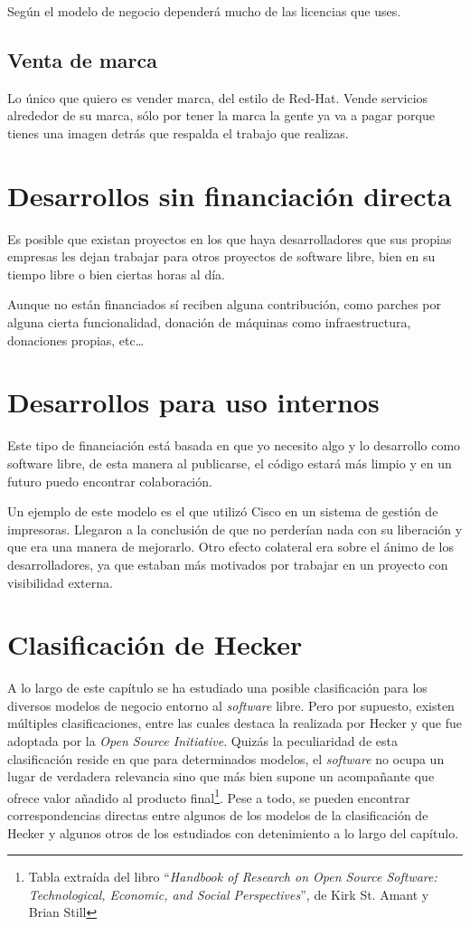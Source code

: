 Según el modelo de negocio dependerá mucho de las licencias que uses.

\subsection{Venta de marca}
Lo único que quiero es vender marca, del estilo de Red-Hat. Vende servicios
alrededor de su marca, sólo por tener la marca la gente ya va a pagar porque
tienes una imagen detrás que respalda el trabajo que realizas.

\section{Desarrollos sin financiación directa}
Es posible que existan proyectos en los que haya desarrolladores que sus
propias empresas les dejan trabajar para otros proyectos de software libre, bien
en su tiempo libre o bien ciertas horas al día.

Aunque no están financiados sí reciben alguna contribución, como parches por
alguna cierta funcionalidad, donación de máquinas como infraestructura,
donaciones propias, etc\ldots


\section{Desarrollos para uso internos}
Este tipo de financiación está basada en que yo necesito algo y lo desarrollo como
software libre, de esta manera al publicarse, el código estará más limpio y en un
futuro puedo encontrar colaboración.

Un ejemplo de este modelo es el que utilizó Cisco en un sistema de
gestión de impresoras. Llegaron a la conclusión de que no perderían
nada con su liberación y que era una manera de mejorarlo. Otro efecto
colateral era sobre el ánimo de los desarrolladores, ya que estaban
más motivados por trabajar en un proyecto con visibilidad externa.


\section{Clasificación de Hecker}

A lo largo de este capítulo se ha estudiado una posible clasificación para los
diversos modelos de negocio entorno al \textit{software} libre. Pero por
supuesto, existen múltiples clasificaciones, entre las cuales destaca la
realizada por Hecker y que fue adoptada por la \textit{Open Source Initiative}.
Quizás la peculiaridad de esta clasificación reside en que para determinados
modelos, el \textit{software} no ocupa un lugar de verdadera relevancia sino que
más bien supone un acompañante que ofrece valor añadido al producto
final\footnote{Tabla extraída del libro ``\textit{Handbook of Research on Open
Source Software: Technological, Economic, and Social Perspectives}'', de Kirk
St. Amant y Brian Still}. Pese a todo, se pueden encontrar correspondencias
directas entre algunos de los modelos de la clasificación de Hecker y
algunos otros de los estudiados con detenimiento a lo largo del capítulo.

